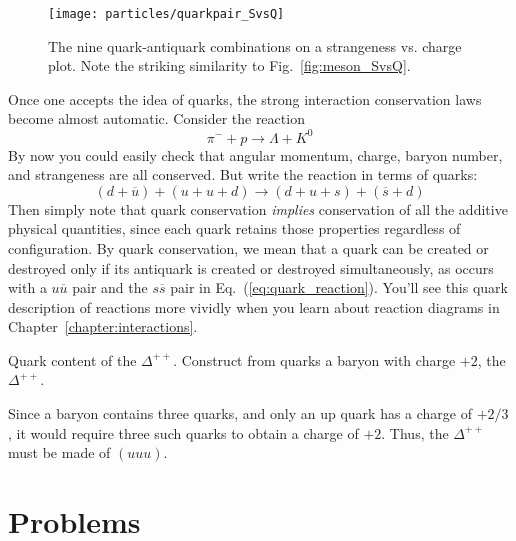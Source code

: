 \begin{figure}[!bp]
\begin{center}
\texttt{[image: particles/quarkpair\_SvsQ]}
\caption{The nine quark-antiquark combinations on a strange\-ness
  vs. charge plot.  Note the striking similarity to
  Fig.~\protect\ref{fig:meson_SvsQ}.}
\label{fig:quarkpair_SvsQ}
\end{center}
\end{figure}

Once one accepts the idea of quarks, the strong interaction
conservation laws become almost automatic.  Consider the reaction
\begin{equation}
\pi^- + p \to \Lambda + K^0
\end{equation}
By now you could easily check that angular momentum, charge,
baryon number, and strange\-ness are all conserved.  But write the
reaction in terms of quarks:
\begin{equation}
(d+\overline u) + (u+u+d) \to (d+u+s) + (\overline s+d)
\label{eq:quark_reaction}
\end{equation}
Then simply note that quark conservation {\em implies}
conservation of all the additive physical quantities, since each
quark retains those properties regardless of configuration.  By
quark conservation, we mean that a quark can be created or
destroyed only if its antiquark is created or destroyed
simultaneously, as occurs with a $u\overline u$ pair and the
$s\overline s$ pair in Eq.~(\ref{eq:quark_reaction}).  You'll see
this quark description of reactions more vividly when you learn
about reaction diagrams in Chapter~\ref{chapter:interactions}.

\begin{example}{Quark content of the $\Delta^{++}$.}
\label{ex:delta}
Construct from quarks a baryon with charge $+2$, the
$\Delta^{++}$.
\begin{solution}
Since a baryon contains three quarks,
and only an up quark has a charge of $+2/3$, it would require
three such quarks to obtain a charge of $+2$.  Thus, the
$\Delta^{++}$ must be made of $(uuu)$.
\end{solution}
\end{example}

\newpage

\section*{Problems}
\label{sec:particles:problems}

